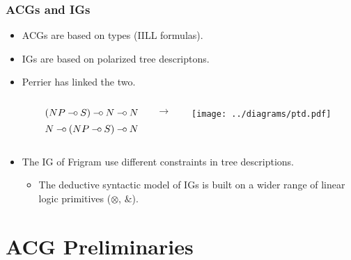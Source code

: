 \documentclass{beamer}
\def\limp {\mathbin{{-}\mkern-3.5mu{\circ}}}
\begin{document}
\begin{frame}
  \frametitle{ACGs and IGs}

  \begin{itemize}
  \item ACGs are based on types (IILL formulas).
  \item IGs are based on polarized tree descriptons.
  \item Perrier has linked the two.

    \vspace{2 mm}
    \begin{columns}[c]
      \begin{column}{0.1\textwidth}\end{column}
      \begin{column}{0.4\textwidth}
        $$(NP \limp S) \limp N \limp N$$
        $$N \limp (NP \limp S) \limp N$$
      \end{column}
      \begin{column}{0.1\textwidth}$\to$\end{column}
      \begin{column}{0.2\textwidth}
        \texttt{[image: ../diagrams/ptd.pdf]}
      \end{column}
      \begin{column}{0.25\textwidth}\end{column}
    \end{columns}
  \item The IG of Frigram use different constraints in tree
    descriptions.
    \begin{itemize}
    \item The deductive syntactic model of IGs is built on a wider range
      of linear logic primitives ($\otimes$, $\&$).
    \end{itemize}
  \end{itemize}
\end{frame}


\section{ACG Preliminaries}

\newcommand{\synt}[1]{C_{\textrm{#1}}}
\end{document}
